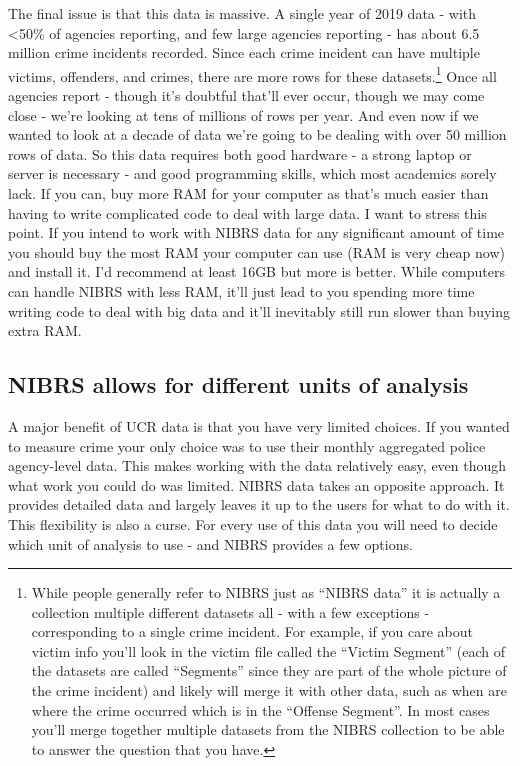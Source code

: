 \documentclass[
]{krantz}
\begin{document}
The final issue is that this data is massive. A single year
of 2019 data - with \textless50\% of agencies reporting, and
few large agencies reporting - has about 6.5 million crime
incidents recorded. Since each crime incident can have
multiple victims, offenders, and crimes, there are more rows
for these datasets.\footnote{While people generally refer to
  NIBRS just as ``NIBRS data'' it is actually a collection
  multiple different datasets all - with a few exceptions -
  corresponding to a single crime incident. For example, if
  you care about victim info you'll look in the victim file
  called the ``Victim Segment'' (each of the datasets are
  called ``Segments'' since they are part of the whole
  picture of the crime incident) and likely will merge it
  with other data, such as when are where the crime occurred
  which is in the ``Offense Segment''. In most cases you'll
  merge together multiple datasets from the NIBRS collection
  to be able to answer the question that you have.} Once all
agencies report - though it's doubtful that'll ever occur,
though we may come close - we're looking at tens of millions
of rows per year. And even now if we wanted to look at a
decade of data we're going to be dealing with over 50
million rows of data. So this data requires both good
hardware - a strong laptop or server is necessary - and good
programming skills, which most academics sorely lack. If you
can, buy more RAM for your computer as that's much easier
than having to write complicated code to deal with large
data. I want to stress this point. If you intend to work
with NIBRS data for any significant amount of time you
should buy the most RAM your computer can use (RAM is very
cheap now) and install it. I'd recommend at least 16GB but
more is better. While computers can handle NIBRS with less
RAM, it'll just lead to you spending more time writing code
to deal with big data and it'll inevitably still run slower
than buying extra RAM.

\subsection{NIBRS allows for different units of
analysis}\label{nibrs-allows-for-different-units-of-analysis}

A major benefit of UCR data is that you have very limited
choices. If you wanted to measure crime your only choice was
to use their monthly aggregated police agency-level data.
This makes working with the data relatively easy, even
though what work you could do was limited. NIBRS data takes
an opposite approach. It provides detailed data and largely
leaves it up to the users for what to do with it. This
flexibility is also a curse. For every use of this data you
will need to decide which unit of analysis to use - and
NIBRS provides a few options.
\end{document}
